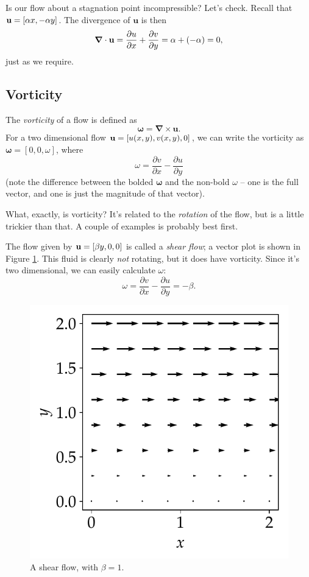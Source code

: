 \begin{example}
Is our flow about a stagnation point incompressible?  Let's check.  Recall that $\mathbf{u} = [\alpha x, -\alpha y]$.  The divergence of $\mathbf{u}$ is then
\[
\boldsymbol{\nabla} \cdot \mathbf{u} = \frac{\partial u}{\partial x} + \frac{\partial v}{\partial y} = \alpha + (-\alpha) = 0,
\]
just as we require.
\end{example}


\subsection{Vorticity}

The \emph{vorticity} of a flow is defined as
\begin{equation}
\boldsymbol{\omega} = \boldsymbol{\nabla} \times \mathbf{u}.
\end{equation}
For a two dimensional flow $\mathbf{u} = [u(x, y), v(x, y), 0]$, we can write the vorticity as $\boldsymbol{\omega} = [0,0,\omega]$, where
\[
\omega = \frac{\partial v}{\partial x} - \frac{\partial u}{\partial y}
\]
(note the difference between the bolded $\boldsymbol{\omega}$ and the non-bold $\omega$ -- one is the full vector, and one is just the magnitude of that vector).

What, exactly, is vorticity?  It's related to the \emph{rotation} of the flow, but is a little trickier than that.  A couple of examples is probably best first.

\begin{example}
The flow given by $\mathbf{u} = [\beta y, 0, 0]$ is called a \emph{shear flow}; a vector plot is shown in Figure \ref{fig_shear}.  This fluid is clearly \emph{not} rotating, but it does have vorticity.  Since it's two dimensional, we can easily calculate $\omega$:
\[
\omega = \frac{\partial v}{\partial x} - \frac{\partial u}{\partial y} = -\beta.
\]
\end{example}

\begin{figure}
\centering
\includegraphics[width=0.5\linewidth]{Figures/Chapter1/fig_shear_vector}
\caption{A shear flow, with $\beta = 1$.}
\label{fig_shear}
\end{figure}

